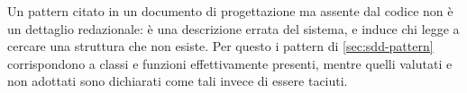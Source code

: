 \begin{nota}
Un pattern citato in un documento di progettazione ma assente dal codice non
è un dettaglio redazionale: è una descrizione errata del sistema, e induce
chi legge a cercare una struttura che non esiste. Per questo i pattern di
\cref{sec:sdd-pattern} corrispondono a classi e funzioni effettivamente
presenti, mentre quelli valutati e non adottati sono dichiarati come tali
invece di essere taciuti.
\end{nota}
